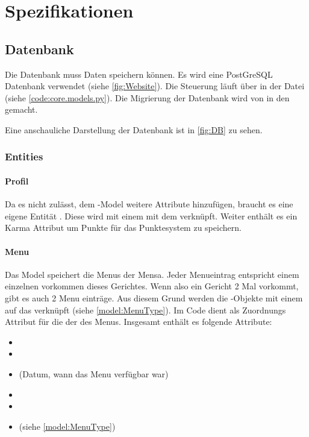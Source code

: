 \chapter{Spezifikationen}
\section{Datenbank}\label{spez:DB} Die Datenbank muss Daten speichern können. Es
wird eine PostGreSQL Datenbank verwendet (siehe \ref{fig:Website}). Die
Steuerung läuft über  in der  Datei (siehe
\ref{code:core.models.py}). Die Migrierung der Datenbank wird von 
in den  gemacht.

Eine anschauliche Darstellung der Datenbank ist in \ref{fig:DB} zu sehen.

\subsection{Entities}
\subsubsection{Profil}\label{model:Profil}
Da  es nicht zulässt, dem -Model weitere Attribute
hinzufügen, braucht es eine eigene Entität . Diese wird mit einem
 mit dem  verknüpft. Weiter enthält es ein Karma
Attribut um Punkte für das Punktesystem zu speichern.

\subsubsection{Menu}\label{model:Menu} Das  Model speichert die Menus
der Mensa. Jeder Menueintrag entspricht einem einzelnen vorkommen dieses
Gerichtes. Wenn also ein Gericht 2 Mal vorkommt, gibt es auch 2 Menu einträge.
Aus diesem Grund werden die -Objekte mit einem  auf
das  verknüpft (siehe \ref{model:MenuType}). Im Code dient als
Zuordnungs Attribut für die  der  des Menus. Insgesamt enthält es
folgende Attribute:
\begin{itemize}
    \item {}
    \item {}
    \item {} (Datum, wann das Menu verfügbar war)
    \item {}
    \item {}
    \item {} (siehe \ref{model:MenuType})
\end{itemize}


